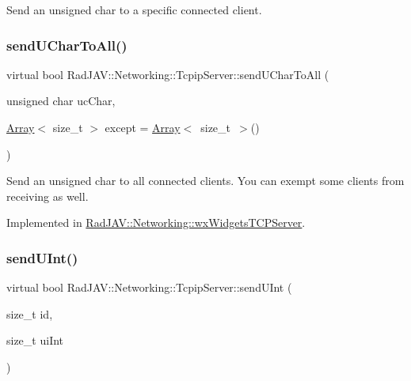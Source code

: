 Send an unsigned char to a specific connected client. \mbox{\label{class_rad_j_a_v_1_1_networking_1_1_tcpip_server_a645c0fa1c860658c7ab04a9fcf530b9a}} 
\subsubsection{\texorpdfstring{send\+U\+Char\+To\+All()}{sendUCharToAll()}}
{\footnotesize\ttfamily virtual bool Rad\+J\+A\+V\+::\+Networking\+::\+Tcpip\+Server\+::send\+U\+Char\+To\+All (\begin{DoxyParamCaption}\item[{unsigned char}]{uc\+Char,  }\item[{\mbox{\hyperlink{class_rad_j_a_v_1_1_array}{Array}}$<$ size\+\_\+t $>$}]{except = {\ttfamily \mbox{\hyperlink{class_rad_j_a_v_1_1_array}{Array}}$<$~size\+\_\+t~$>$()} }\end{DoxyParamCaption})\hspace{0.3cm}{\ttfamily [pure virtual]}}

Send an unsigned char to all connected clients. You can exempt some clients from receiving as well. 

Implemented in \mbox{\hyperlink{class_rad_j_a_v_1_1_networking_1_1wx_widgets_t_c_p_server_a5a2d9c4355ceaac7d771475b2549b8e1}{Rad\+J\+A\+V\+::\+Networking\+::wx\+Widgets\+T\+C\+P\+Server}}.

\mbox{\label{class_rad_j_a_v_1_1_networking_1_1_tcpip_server_a69c51983234182cde5e657b6445c9e82}} 
\subsubsection{\texorpdfstring{send\+U\+Int()}{sendUInt()}}
{\footnotesize\ttfamily virtual bool Rad\+J\+A\+V\+::\+Networking\+::\+Tcpip\+Server\+::send\+U\+Int (\begin{DoxyParamCaption}\item[{size\+\_\+t}]{id,  }\item[{size\+\_\+t}]{ui\+Int }\end{DoxyParamCaption})\hspace{0.3cm}{\ttfamily [pure virtual]}}

